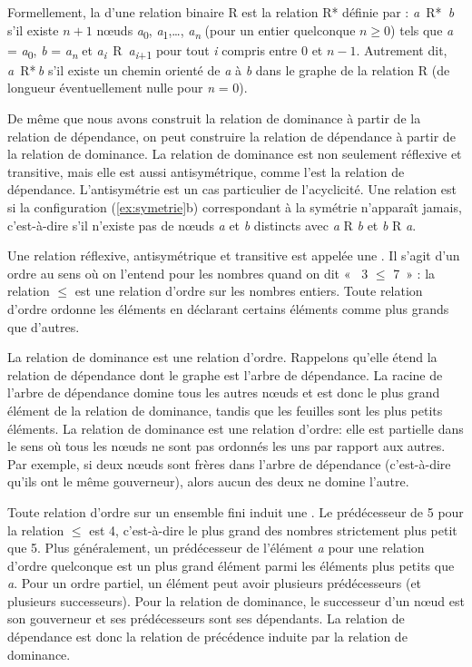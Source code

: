 {    Formellement, la  d’une relation binaire R est la relation R* définie par : \textit{a~}R*\textit{~b} s’il existe $n+1$ nœuds \textit{a}\textsubscript{0}, \textit{a}\textsubscript{1},…, \textit{a\textsubscript{n}} (pour un entier quelconque $n \geq 0$) tels que \textit{a} = \textit{a}\textsubscript{0}, \textit{b} = \textit{a\textsubscript{n}} et \textit{a\textsubscript{i}}~R~\textit{a\textsubscript{i}}\textsubscript{+1} pour tout \textit{i} compris entre 0 et $n-1$. Autrement dit, \textit{a}~R*\,\textit{b} s’il existe un chemin orienté de \textit{a} à \textit{b} dans le graphe de la relation R (de longueur éventuellement nulle pour \textit{n} = 0).

    De même que nous avons construit la relation de dominance à partir de la relation de dépendance, on peut construire la relation de dépendance à partir de la relation de dominance. La relation de dominance est non seulement réflexive et transitive, mais elle est aussi antisymétrique, comme l’est la relation de dépendance. L’antisymétrie est un cas particulier de l’acyclicité. Une relation est  si la configuration (\ref{ex:symetrie}b) correspondant à la symétrie n’apparaît jamais, c’est-à-dire s’il n’existe pas de nœuds \textit{a} et \textit{b} distincts avec \textit{a} R \textit{b} et \textit{b} R \textit{a}.

    Une relation réflexive, antisymétrique et transitive est appelée une . Il s’agit d’un ordre au sens où on l’entend pour les nombres quand on dit «~ 3 ${\leq}$ 7~» : la relation ${\leq}$ est une relation d’ordre sur les nombres entiers. Toute relation d’ordre ordonne les éléments en déclarant certains éléments comme plus grands que d’autres.

    La relation de dominance est une relation d’ordre. Rappelons qu’elle étend la relation de dépendance dont le graphe est l’arbre de dépendance. La racine de l'arbre de dépendance domine tous les autres nœuds et est donc le plus grand élément de la relation de dominance, tandis que les feuilles sont les plus petits éléments. La relation de dominance est une relation d’ordre: elle est partielle dans le sens où tous les nœuds ne sont pas ordonnés les uns par rapport aux autres. Par exemple, si deux nœuds sont frères dans l’arbre de dépendance (c’est-à-dire qu’ils ont le même gouverneur), alors aucun des deux ne domine l’autre.

    Toute relation d’ordre sur un ensemble fini induit une . Le prédécesseur de 5 pour la relation ${\leq}$ est 4, c’est-à-dire le plus grand des nombres strictement plus petit que 5. Plus généralement, un prédécesseur de l’élément \textit{a} pour une relation d’ordre quelconque est un plus grand élément parmi les éléments plus petits que \textit{a}. Pour un ordre partiel, un élément peut avoir plusieurs prédécesseurs (et plusieurs successeurs). Pour la relation de dominance, le successeur d’un nœud est son gouverneur et ses prédécesseurs sont ses dépendants. La relation de dépendance est donc la relation de précédence induite par la relation de dominance.

}
